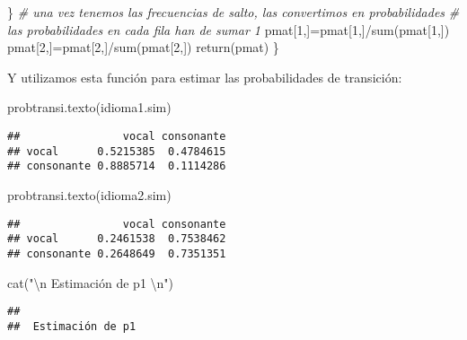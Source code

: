 \documentclass[
]{book}
\newenvironment{Shaded}{\begin{snugshade}}{\end{snugshade}}
\newcommand{\CommentTok}[1]{\textcolor[rgb]{0.56,0.35,0.01}{\textit{#1}}}
\newcommand{\DecValTok}[1]{\textcolor[rgb]{0.00,0.00,0.81}{#1}}
\newcommand{\FunctionTok}[1]{\textcolor[rgb]{0.00,0.00,0.00}{#1}}
\newcommand{\NormalTok}[1]{#1}
\newcommand{\OtherTok}[1]{\textcolor[rgb]{0.56,0.35,0.01}{#1}}
\newcommand{\SpecialCharTok}[1]{\textcolor[rgb]{0.00,0.00,0.00}{#1}}
\newcommand{\StringTok}[1]{\textcolor[rgb]{0.31,0.60,0.02}{#1}}
\theoremstyle{definition}
\theoremstyle{definition}
\theoremstyle{definition}
\theoremstyle{definition}
\theoremstyle{remark}
\begin{document}
\begin{Shaded}
\begin{Highlighting}[]
\NormalTok{\}}
\CommentTok{\# una vez tenemos las frecuencias de salto, las convertimos en probabilidades}
\CommentTok{\# las probabilidades en cada fila han de sumar 1}
\NormalTok{pmat[}\DecValTok{1}\NormalTok{,]}\OtherTok{=}\NormalTok{pmat[}\DecValTok{1}\NormalTok{,]}\SpecialCharTok{/}\FunctionTok{sum}\NormalTok{(pmat[}\DecValTok{1}\NormalTok{,])}
\NormalTok{pmat[}\DecValTok{2}\NormalTok{,]}\OtherTok{=}\NormalTok{pmat[}\DecValTok{2}\NormalTok{,]}\SpecialCharTok{/}\FunctionTok{sum}\NormalTok{(pmat[}\DecValTok{2}\NormalTok{,])}
\FunctionTok{return}\NormalTok{(pmat)}
\NormalTok{\}}
\end{Highlighting}
\end{Shaded}

Y utilizamos esta función para estimar las probabilidades de transición:

\begin{Shaded}
\begin{Highlighting}[]
\FunctionTok{probtransi.texto}\NormalTok{(idioma1.sim)}
\end{Highlighting}
\end{Shaded}

\begin{verbatim}
##                vocal consonante
## vocal      0.5215385  0.4784615
## consonante 0.8885714  0.1114286
\end{verbatim}

\begin{Shaded}
\begin{Highlighting}[]
\FunctionTok{probtransi.texto}\NormalTok{(idioma2.sim)}
\end{Highlighting}
\end{Shaded}

\begin{verbatim}
##                vocal consonante
## vocal      0.2461538  0.7538462
## consonante 0.2648649  0.7351351
\end{verbatim}

\begin{Shaded}
\begin{Highlighting}[]
\FunctionTok{cat}\NormalTok{(}\StringTok{"}\SpecialCharTok{\textbackslash{}n}\StringTok{ Estimación de p1 }\SpecialCharTok{\textbackslash{}n}\StringTok{"}\NormalTok{)}
\end{Highlighting}
\end{Shaded}

\begin{verbatim}
## 
##  Estimación de p1
\end{verbatim}
\end{document}
